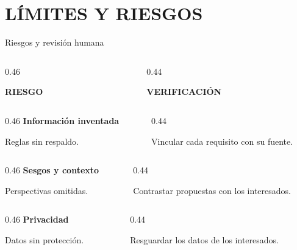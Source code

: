 \documentclass[aspectratio=169,12pt]{beamer}
\newcommand{\etiqueta}[1]{{\fontsize{7.5}{9}\selectfont\bfseries\color{Accent}#1\par}}
\newcommand{\texto}[1]{{\fontsize{11}{14}\selectfont #1\par}}
\newcommand{\fuentesactuales}{}
\newcommand{\fuentesdiapositiva}[1]{\gdef\fuentesactuales{#1}}
\begin{document}
\section{LÍMITES Y RIESGOS}
\begin{frame}[t]{Riesgos y revisión humana}
\fuentesdiapositiva{Riesgos: \cite{cheng2026genai,arora2024advancing}\qquad
  Criterios de revisión: \cite{ireb2026foundation,vogelsang2025guideline}}
\begin{columns}[T,onlytextwidth]
\begin{column}{0.46\textwidth}
\etiqueta{RIESGO}
\end{column}
\begin{column}{0.44\textwidth}
\etiqueta{VERIFICACIÓN}
\end{column}
\end{columns}
\vspace{3mm}
\begin{columns}[T,onlytextwidth]
\begin{column}{0.46\textwidth}
{\bfseries Información inventada}\par
\texto{Reglas sin respaldo.}
\end{column}
\begin{column}{0.44\textwidth}
\texto{Vincular cada requisito con su fuente.}
\end{column}
\end{columns}
\vspace{4mm}
\begin{columns}[T,onlytextwidth]
\begin{column}{0.46\textwidth}
{\bfseries Sesgos y contexto}\par
\texto{Perspectivas omitidas.}
\end{column}
\begin{column}{0.44\textwidth}
\texto{Contrastar propuestas con los interesados.}
\end{column}
\end{columns}
\vspace{4mm}
\begin{columns}[T,onlytextwidth]
\begin{column}{0.46\textwidth}
{\bfseries Privacidad}\par
\texto{Datos sin protección.}
\end{column}
\begin{column}{0.44\textwidth}
\texto{Resguardar los datos de los interesados.}
\end{column}
\end{columns}
\vfill
\vspace{1mm}
\end{frame}
\end{document}

